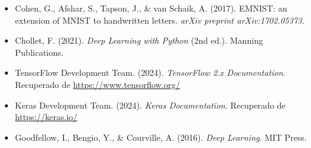 \documentclass[12pt,a4paper]{article}
\begin{document}
\begin{itemize}
    \item Cohen, G., Afshar, S., Tapson, J., \& van Schaik, A. (2017). EMNIST: an extension of MNIST to handwritten letters. \textit{arXiv preprint arXiv:1702.05373}.

    \item Chollet, F. (2021). \textit{Deep Learning with Python} (2nd ed.). Manning Publications.

    \item TensorFlow Development Team. (2024). \textit{TensorFlow 2.x Documentation}. Recuperado de \url{https://www.tensorflow.org/}

    \item Keras Development Team. (2024). \textit{Keras Documentation}. Recuperado de \url{https://keras.io/}

    \item Goodfellow, I., Bengio, Y., \& Courville, A. (2016). \textit{Deep Learning}. MIT Press.
\end{itemize}
\end{document}
